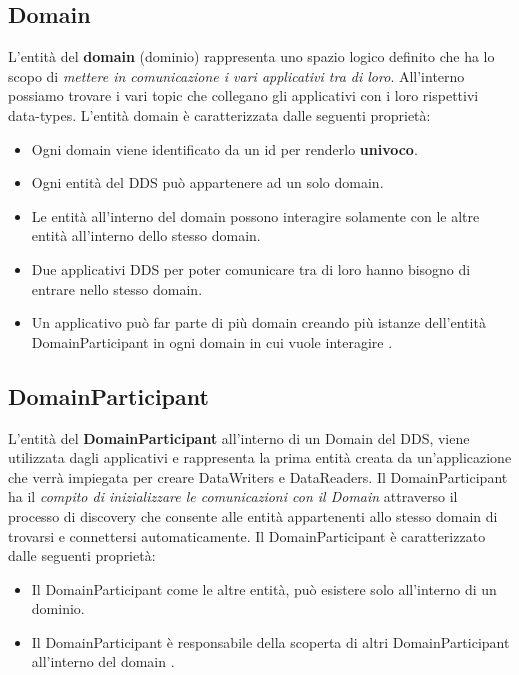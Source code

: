 \subsection{Domain}
L'entità del \textbf{domain} (dominio) rappresenta uno spazio logico definito che
ha lo scopo di \textit{mettere in comunicazione i vari applicativi tra di loro}.
All'interno possiamo trovare i vari topic che collegano gli applicativi
con i loro rispettivi data-types.
L'entità domain è caratterizzata dalle seguenti proprietà:
\begin{itemize}
    \item Ogni domain viene identificato da un id 
    per renderlo \textbf{univoco}.
    \item Ogni entità del DDS può appartenere
    ad un solo domain.
    \item Le entità all'interno del domain possono interagire
    solamente con le altre entità all'interno dello stesso domain.
    \item Due applicativi DDS per poter comunicare tra di loro
    hanno bisogno di entrare nello stesso domain.
    \item Un applicativo può far parte di più domain creando 
    più istanze dell'entità DomainParticipant in ogni
    domain in cui vuole interagire \cite{domainrti}.
\end{itemize}


\subsection{DomainParticipant}
L'entità del \textbf{DomainParticipant} all'interno di un Domain del DDS,
viene utilizzata dagli applicativi e 
rappresenta la prima entità creata da un'applicazione che verrà 
impiegata per creare DataWriters e DataReaders. 
Il DomainParticipant ha il \textit{compito di inizializzare
le comunicazioni con il Domain} attraverso 
il processo di discovery che consente alle entità appartenenti allo 
stesso domain di trovarsi e connettersi automaticamente.
Il DomainParticipant è caratterizzato dalle seguenti proprietà:
\begin{itemize}
    \item Il DomainParticipant come le altre entità, può 
    esistere solo all'interno di un dominio.
    \item Il DomainParticipant è responsabile della scoperta di altri
    DomainParticipant all'interno del domain \cite{domainparticipantrti}.
\end{itemize}



